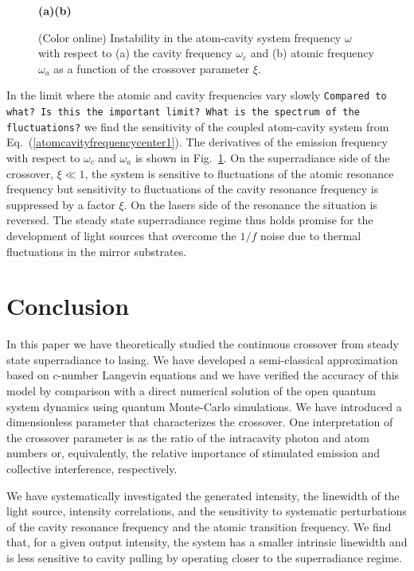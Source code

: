 \documentclass[aps,
twocolumn,
showpacs,
superscriptaddress,groupedaddress]{revtex4}
\newcommand{\dmcomment}[1]{{\tt #1}}
\begin{document}
\begin{figure}
\begin{center}
\hspace{2mm} \textbf{(a)}\hspace{40mm}\textbf{(b)} \hspace{35mm}
\end{center}
\caption{(Color online) Instability in the atom-cavity system frequency
$\omega$ with respect to (a) the cavity frequency $\omega_c$ and (b)
atomic frequency $\omega_a$ as a function of the crossover parameter
$\xi$.}
\label{CavityInstability}
\end{figure}

In the limit where the atomic and cavity frequencies vary slowly
\dmcomment{Compared to what? Is this the important limit? What is the
spectrum of the fluctuations?} we find the sensitivity of the coupled
atom-cavity system from Eq.~(\ref{atomcavityfrequencycenter1}).  The
derivatives of the emission frequency with respect to $\omega_c$ and
$\omega_a$ is shown in Fig.~\ref{CavityInstability}.  On the
superradiance side of the crossover, $\xi \ll 1$, the system is
sensitive to fluctuations of the atomic resonance frequency but
sensitivity to fluctuations of the cavity resonance frequency is
suppressed by a factor $\xi$.  On the lasers side of the resonance the
situation is reversed.  The steady state superradiance regime thus holds
promise for the development of light sources that overcome the $1/f$
noise due to thermal fluctuations in the mirror substrates.


\section{Conclusion}

In this paper we have theoretically studied the continuous crossover
from steady state superradiance to lasing.  We have developed a
semi-classical approximation based on $c$-number Langevin equations and
we have verified the accuracy of this model by comparison with a direct
numerical solution of the open quantum system dynamics using quantum
Monte-Carlo simulations.  We have introduced a dimensionless parameter
that characterizes the crossover.  One interpretation of the crossover
parameter is as the ratio of the intracavity photon and atom numbers or,
equivalently, the relative importance of stimulated emission and
collective interference, respectively.

We have systematically investigated the generated intensity, the
linewidth of the light source, intensity correlations, and the
sensitivity to systematic perturbations of the cavity resonance
frequency and the atomic transition frequency.  We find that, for a given
output intensity, the system has a smaller intrinsic linewidth and is
less sensitive to cavity pulling by operating closer to the
superradiance  regime.
\end{document}
